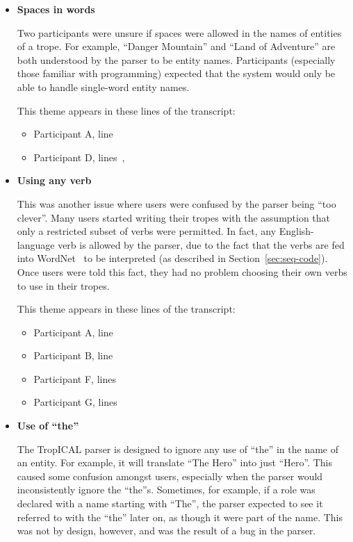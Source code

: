 \documentclass[11pt]{report}
\begin{document}
\begin{itemize}
\item \textbf{Spaces in words}

Two participants were unsure if spaces were allowed in the names of entities of
a trope. For example, ``Danger Mountain'' and ``Land of Adventure'' are both
understood by the parser to be entity names. Participants (especially those
familiar with programming) expected that the system would only be able to handle
single-word entity names.

This theme appears in these lines of the transcript:

\begin{itemize}
\item Participant A, line~
\item Participant D, lines~,~
\end{itemize}

\item \textbf{Using any verb}

This was another issue where users were confused by the parser being ``too
clever''. Many users started writing their tropes with the assumption that only
a restricted subset of verbs were permitted. In fact, any English-language verb
is allowed by the parser, due to the fact that the verbs are fed into WordNet~\citep{miller1995wordnet} to
be interpreted (as described in Section~\ref{sec:seq-code}). Once users were told this fact, they had no problem choosing
their own verbs to use in their tropes.

This theme appears in these lines of the transcript:

\begin{itemize}
\item Participant A, line~
\item Participant B, line~
\item Participant F, lines~
\item Participant G, lines~
\end{itemize}

\item \textbf{Use of ``the''}

The TropICAL parser is designed to ignore any use of ``the'' in the name of an
entity. For example, it will translate ``The Hero'' into just ``Hero''. This
caused some confusion amongst users, especially when the parser would
inconsistently ignore the ``the''s. Sometimes, for example, if a role was
declared with a name starting with ``The'', the parser expected to see it
referred to with the ``the'' later on, as though it were part of the name. This
was not by design, however, and was the result of a bug in the parser.


\end{itemize}
\end{document}
